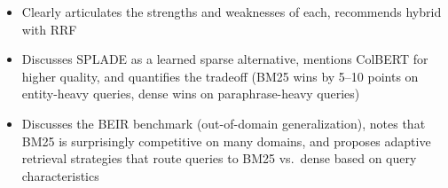 \begin{interviewq}

\goodgreat
\begin{itemize}
    \item {} Clearly articulates the strengths and weaknesses of each,
          recommends hybrid with RRF
    \item {} Discusses SPLADE as a learned sparse alternative, mentions
          ColBERT for higher quality, and quantifies the tradeoff (BM25 wins by
          5--10 points on entity-heavy queries, dense wins on paraphrase-heavy queries)
    \item {} Discusses the BEIR benchmark (out-of-domain generalization),
          notes that BM25 is surprisingly competitive on many domains, and proposes
          adaptive retrieval strategies that route queries to BM25 vs.\ dense based
          on query characteristics
\end{itemize}

\end{interviewq}

\bigskip

